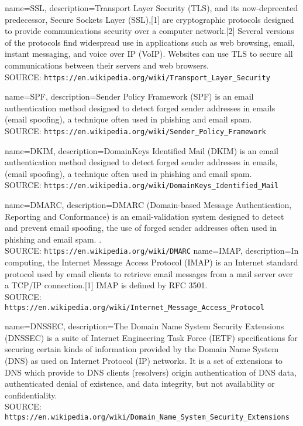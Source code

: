 {
	name=SSL,
	description={Transport Layer Security (TLS), and its now-deprecated predecessor, Secure Sockets Layer (SSL),[1] are cryptographic protocols designed to provide communications security over a computer network.[2] Several versions of the protocols find widespread use in applications such as web browsing, email, instant messaging, and voice over IP (VoIP). Websites can use TLS to secure all communications between their servers and web browsers. \\SOURCE: \texttt{https://en.wikipedia.org/wiki/Transport\_Layer\_Security}}
}

{
	name=SPF,
	description={Sender Policy Framework (SPF) is an email authentication method designed to detect forged sender addresses in emails (email spoofing), a technique often used in phishing and email spam. \\SOURCE: \texttt{https://en.wikipedia.org/wiki/Sender\_Policy\_Framework}}
}

{
	name=DKIM,
	description={DomainKeys Identified Mail (DKIM) is an email authentication method designed to detect forged sender addresses in emails, (email spoofing), a technique often used in phishing and email spam.  \\SOURCE: \texttt{https://en.wikipedia.org/wiki/DomainKeys\_Identified\_Mail}}
}

{
	name=DMARC,
	description={DMARC (Domain-based Message Authentication, Reporting and Conformance) is an email-validation system designed to detect and prevent email spoofing, the use of forged sender addresses often used in phishing and email spam. . \\SOURCE: \texttt{https://en.wikipedia.org/wiki/DMARC}}
}
{
	name=IMAP,
	description={In computing, the Internet Message Access Protocol (IMAP) is an Internet standard protocol used by email clients to retrieve email messages from a mail server over a TCP/IP connection.[1] IMAP is defined by RFC 3501.  \\SOURCE: \texttt{https://en.wikipedia.org/wiki/Internet\_Message\_Access\_Protocol}}
}


{
	name=DNSSEC,
	description={The Domain Name System Security Extensions (DNSSEC) is a suite of Internet Engineering Task Force (IETF) specifications for securing certain kinds of information provided by the Domain Name System (DNS) as used on Internet Protocol (IP) networks. It is a set of extensions to DNS which provide to DNS clients (resolvers) origin authentication of DNS data, authenticated denial of existence, and data integrity, but not availability or confidentiality.\\SOURCE: \texttt{https://en.wikipedia.org/wiki/Domain\_Name\_System\_Security\_Extensions}}
}

